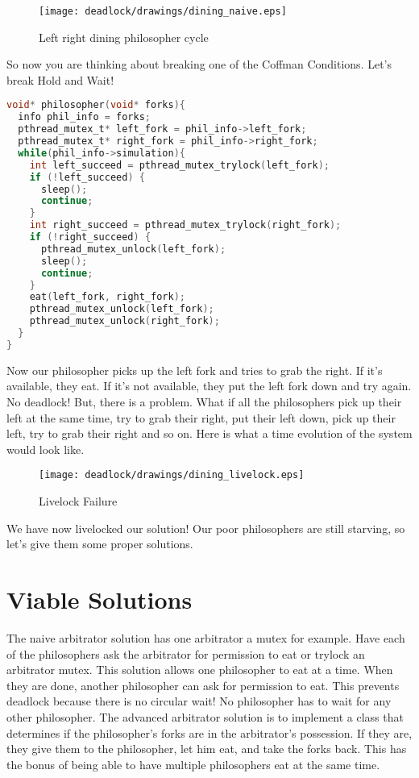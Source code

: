 \begin{figure}[H]
\centering
\texttt{[image: deadlock/drawings/dining\_naive.eps]}
\caption{Left right dining philosopher cycle}
\end{figure}


So now you are thinking about breaking one of the Coffman Conditions.
Let's break Hold and Wait!

\begin{lstlisting}[language=C]
void* philosopher(void* forks){
  info phil_info = forks;
  pthread_mutex_t* left_fork = phil_info->left_fork;
  pthread_mutex_t* right_fork = phil_info->right_fork;
  while(phil_info->simulation){
    int left_succeed = pthread_mutex_trylock(left_fork);
    if (!left_succeed) {
      sleep();
      continue;
    }
    int right_succeed = pthread_mutex_trylock(right_fork);
    if (!right_succeed) {
      pthread_mutex_unlock(left_fork);
      sleep();
      continue;
    }
    eat(left_fork, right_fork);
    pthread_mutex_unlock(left_fork);
    pthread_mutex_unlock(right_fork);
  }
}
\end{lstlisting}

Now our philosopher picks up the left fork and tries to grab the right.
If it's available, they eat.
If it's not available, they put the left fork down and try again.
No deadlock! But, there is a problem.
What if all the philosophers pick up their left at the same time, try to grab their right, put their left down, pick up their left, try to grab their right and so on.
Here is what a time evolution of the system would look like.

\begin{figure}[H]
\centering
\texttt{[image: deadlock/drawings/dining\_livelock.eps]}
\caption{Livelock Failure}
\end{figure}

We have now livelocked our solution! Our poor philosophers are still starving, so let's give them some proper solutions.

\section{Viable Solutions}

The naive arbitrator solution has one arbitrator a mutex for example.
Have each of the philosophers ask the arbitrator for permission to eat or trylock an arbitrator mutex.
This solution allows one philosopher to eat at a time.
When they are done, another philosopher can ask for permission to eat.
This prevents deadlock because there is no circular wait! No philosopher has to wait for any other philosopher.
The advanced arbitrator solution is to implement a class that determines if the philosopher's forks are in the arbitrator's possession.
If they are, they give them to the philosopher, let him eat, and take the forks back.
This has the bonus of being able to have multiple philosophers eat at the same time.

